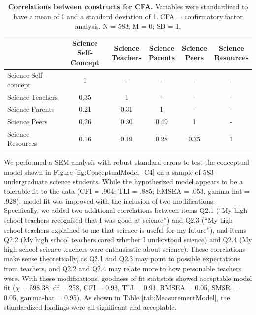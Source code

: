 \begin{table}[ht]
\begin{tabular}{lccccc}
\cline{2-6}
                  & \parbox{16mm}{\centering Science\\ Self-Concept} & \parbox{13mm}{\centering Science\\ Teachers} &  \parbox{12mm}{\centering Science\\ Parents} & \parbox{12mm}{\centering Science\\ Peers} & \parbox{12mm}{\centering Science\\ Resources} \\ \hline
Science Self-concept  & 1                & -                & -               & -             & -                 \\
Science Teachers  & 0.35            & 1                & -               & -             & -                 \\
Science Parents   & 0.21            & 0.31            & 1               & -             & -                 \\
Science Peers     & 0.26            & 0.30            & 0.49            & 1             & -                 \\
Science Resources & 0.16            & 0.19            & 0.28           & 0.35         & 1                 \\ \hline
\end{tabular}
\caption{\textbf{Correlations between constructs for CFA.}  Variables were standardized to have a mean of 0 and a standard deviation of 1. CFA = confirmatory factor analysis. N = 583; M = 0; SD = 1.}
\label{tab:Correlations}       %
\end{table}


We performed a SEM analysis with robust standard errors to test the conceptual model shown in Figure \ref{fig:ConceptualModel_C4} on a sample of 583 undergraduate science students. While the hypothesized model appears to be a tolerable fit to the data (CFI = .904; TLI = .885;  RMSEA = .053, gamma-hat =  .928), model fit was improved with the inclusion of two modifications. Specifically, we added two additional correlations between items Q2.1 (``My high school teachers recognised that I was good at science'') and Q2.3 (``My high school teachers explained to me that science is useful for my future''), and items Q2.2 (My high school teachers cared whether I understood science) and Q2.4 (My  high  school  science  teachers  were enthusiastic about science). These correlations make sense theoretically, as Q2.1 and Q2.3 may point to possible expectations from teachers, and Q2.2 and Q2.4 may relate more to how personable teachers were. With these modifications, goodness of fit statistics showed acceptable model fit \citep{hu1999cutoff,steiger2007understanding} ($\chi$ = 598.38, df = 258, CFI = 0.93, TLI = 0.91, RMSEA = 0.05, SMSR = 0.05, gamma-hat = 0.95). As shown in Table \ref{tab:MeasurementModel}, the standardized loadings were all significant and acceptable. 

